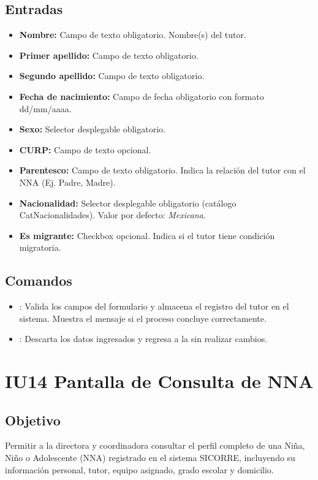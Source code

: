 \subsection{Entradas}
\begin{itemize}
	\item \textbf{Nombre:} Campo de texto obligatorio. Nombre(s) del tutor.
	\item \textbf{Primer apellido:} Campo de texto obligatorio.
	\item \textbf{Segundo apellido:} Campo de texto obligatorio.
	\item \textbf{Fecha de nacimiento:} Campo de fecha obligatorio con formato dd/mm/aaaa.
	\item \textbf{Sexo:} Selector desplegable obligatorio.
	\item \textbf{CURP:} Campo de texto opcional.
	\item \textbf{Parentesco:} Campo de texto obligatorio. Indica la relación del tutor con el NNA (Ej. Padre, Madre).
	\item \textbf{Nacionalidad:} Selector desplegable obligatorio (catálogo CatNacionalidades). Valor por defecto: \textit{Mexicana}.
	\item \textbf{Es migrante:} Checkbox opcional. Indica si el tutor tiene condición migratoria.
\end{itemize}

\subsection{Comandos}
\begin{itemize}
	\item {}: Valida los campos del formulario y almacena el registro del tutor en el sistema. Muestra el mensaje  si el proceso concluye correctamente.
	\item {}: Descarta los datos ingresados y regresa a la  sin realizar cambios.
\end{itemize}

\section{IU14 Pantalla de Consulta de NNA}

\subsection{Objetivo}
Permitir a la directora y coordinadora consultar el perfil completo de una Niña, 
Niño o Adolescente (NNA) registrado en el sistema SICORRE, incluyendo su 
información personal, tutor, equipo asignado, grado escolar y domicilio.

